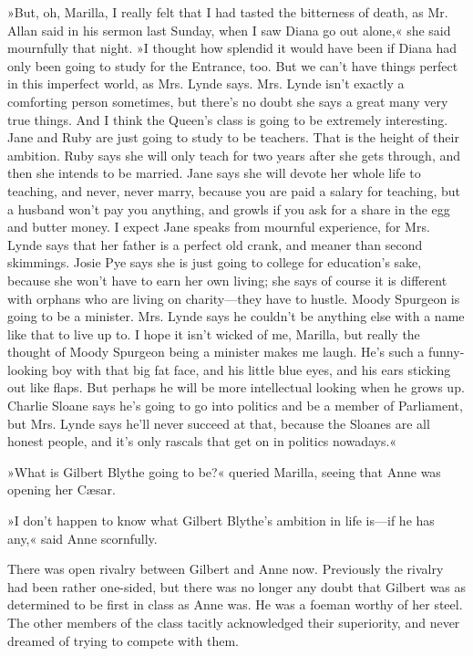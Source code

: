 »But, oh, Marilla, I really felt that I had tasted the bitterness of death, as Mr. Allan said in his sermon last Sunday, when I saw Diana go out alone,« she said mournfully that night. »I thought how splendid it would have been if Diana had only been going to study for the Entrance, too. But we can’t have things perfect in this imperfect world, as Mrs. Lynde says. Mrs. Lynde isn’t exactly a comforting person sometimes, but there’s no doubt she says a great many very true things. And I think the Queen’s class is going to be extremely interesting. Jane and Ruby are just going to study to be teachers. That is the height of their ambition. Ruby says she will only teach for two years after she gets through, and then she intends to be married. Jane says she will devote her whole life to teaching, and never, never marry, because you are paid a salary for teaching, but a husband won’t pay you anything, and growls if you ask for a share in the egg and butter money. I expect Jane speaks from mournful experience, for Mrs. Lynde says that her father is a perfect old crank, and meaner than second skimmings. Josie Pye says she is just going to college for education’s sake, because she won’t have to earn her own living; she says of course it is different with orphans who are living on charity—they have to hustle. Moody Spurgeon is going to be a minister. Mrs. Lynde says he couldn’t be anything else with a name like that to live up to. I hope it isn’t wicked of me, Marilla, but really the thought of Moody Spurgeon being a minister makes me laugh. He’s such a funny-looking boy with that big fat face, and his little blue eyes, and his ears sticking out like flaps. But perhaps he will be more intellectual looking when he grows up. Charlie Sloane says he’s going to go into politics and be a member of Parliament, but Mrs. Lynde says he’ll never succeed at that, because the Sloanes are all honest people, and it’s only rascals that get on in politics nowadays.«

»What is Gilbert Blythe going to be?« queried Marilla, seeing that Anne was opening her Cæsar.

»I don’t happen to know what Gilbert Blythe’s ambition in life is—if he has any,« said Anne scornfully.

There was open rivalry between Gilbert and Anne now. Previously the rivalry had been rather one-sided, but there was no longer any doubt that Gilbert was as determined to be first in class as Anne was. He was a foeman worthy of her steel. The other members of the class tacitly acknowledged their superiority, and never dreamed of trying to compete with them.

